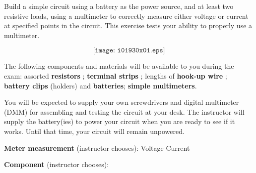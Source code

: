 

Build a simple circuit using a battery as the power source, and at least two resistive loads, using a multimeter to correctly measure either voltage or current at specified points in the circuit.  This exercise tests your ability to properly use a multimeter.

$$\texttt{[image: i01930x01.eps]}$$

\vskip 10pt

The following components and materials will be available to you during the exam: assorted {\bf resistors} ; {\bf terminal strips} ; lengths of {\bf hook-up wire} ; {\bf battery clips} (holders) and {\bf batteries}; {\bf simple multimeters}.

\vskip 10pt

You will be expected to supply your own screwdrivers and digital multimeter (DMM) for assembling and testing the circuit at your desk.  The instructor will supply the battery(ies) to power your circuit when you are ready to see if it works.  Until that time, your circuit will remain unpowered.

\vskip 10pt

\noindent
{\bf Meter measurement} (instructor chooses): \hskip 20pt \underbar{\hskip 20pt} Voltage \hskip 20pt \underbar{\hskip 20pt} Current

\vskip 10pt

\noindent
{\bf Component} (instructor chooses): 

\vfil


















